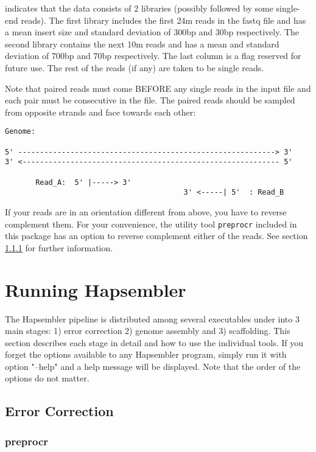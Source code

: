 \documentclass[12pt,a4paper]{report}
\begin{document}
indicates that the data consists of 2 libraries (possibly followed by some single-end reads). The first library includes the first 24m reads in the fastq file and has a mean insert size and standard deviation of 300bp and 30bp respectively. The second library contains the next 10m reads and has a mean and standard deviation of 700bp and 70bp respectively. The last column is a flag reserved for future use. The rest of the reads (if any) are taken to be single reads. 

Note that paired reads must come BEFORE any single reads in the input file and each pair must be consecutive in the file. The paired reads should be sampled from opposite strands and face towards each other:

\begin{verbatim}
Genome:

5' -----------------------------------------------------------> 3'
3' <----------------------------------------------------------- 5'

       Read_A:  5' |-----> 3'
                                         3' <-----| 5'  : Read_B
\end{verbatim}

If your reads are in an orientation different from above, you have to reverse complement them. For your convenience, the utility tool \texttt{preprocr} included in this package has an option to reverse complement either of the reads. See section \ref{utils} for further information.

\section{Running Hapsembler}

The Hapsembler pipeline is distributed among several executables under into 3 main stages: 1) error correction 2) genome assembly and 3) scaffolding. This section describes each stage in detail and how to use the individual tools. If you forget the options available to any Hapsembler program, simply run it with option "--help" and a help message will be displayed. Note that the order of the options do not matter.

\subsection{Error Correction}

\subsubsection{preprocr}
\label{utils}
\end{document}
